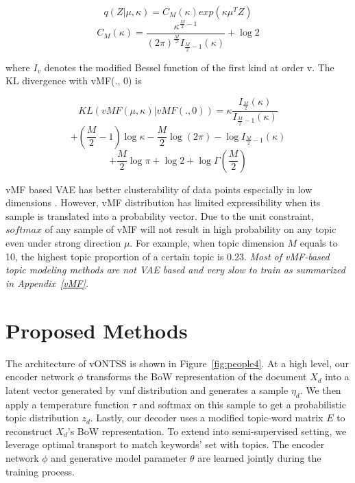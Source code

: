 \documentclass[11pt]{article}
\begin{document}
$$q(Z|\mu, \kappa) = C_{M}(\kappa) exp(\kappa\mu^{T}Z)$$
$$C_{M}(\kappa) = \frac{\kappa^{\frac{M}{2} - 1}}{(2\pi)^{\frac{M}{2}} I_{\frac{M}{2} - 1}(\kappa)} + \log 2$$


where $I_{v}$ denotes the modified Bessel function of the first kind at order v. The KL divergence with vMF(., 0) \cite{davidson2018hyperspherical} is


$$KL(vMF(\mu, \kappa)|vMF(.,0)) = \kappa\frac{I_{\frac{M}{2}}(\kappa)}{I_{\frac{M}{2}-1}(\kappa)} $$
$$+ (\frac{M}{2} - 1) \log \kappa - \frac{M}{2} \log (2\pi)  - \log I_{\frac{M}{2}-1}(\kappa) $$ $$+ \frac{M}{2} \log \pi + \log 2 + \log \Gamma(\frac{M}{2})$$


vMF based VAE has better clusterability of data points especially in low dimensions \cite{guu2018generating}. However, vMF distribution has limited expressibility when its sample is translated into a probability vector. Due to the unit constraint, $softmax$ of any sample of vMF will not result in high probability on any topic even under strong direction $\mu$. For example, when topic dimension $M$ equals to 10, the highest topic proportion of a certain topic is 0.23. \textit{Most of vMF-based topic modeling methods are not VAE based and very slow to train as summarized in Appendix~\ref{vMF}.}














\section{Proposed Methods}




The architecture of vONTSS is shown in Figure~\ref{fig:people4}. At a high level, our encoder network $\phi$ transforms the BoW representation of the document $X_{d}$ into a latent vector generated by vmf distribution and generates a sample $\eta_{d}$. We then apply a temperature function $\tau$ and softmax on this sample to get a probabilistic topic distribution $z_{d}$. Lastly, our decoder uses a modified topic-word matrix $E$ to reconstruct $X_{d}$'s BoW representation. To extend into semi-supervised setting, we leverage optimal transport to match keywords' set with topics. The encoder network $\phi$ and generative model parameter $\theta$ are learned jointly during the training process.
\end{document}
